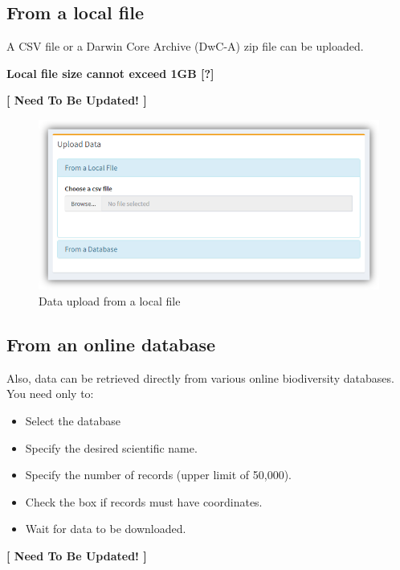 \documentclass[]{book}
\providecommand{\tightlist}{%
  \setlength{\itemsep}{0pt}\setlength{\parskip}{0pt}}
\theoremstyle{definition}
\theoremstyle{definition}
\theoremstyle{definition}
\theoremstyle{remark}
\begin{document}
\subsection{From a local file}\label{from-a-local-file}

A CSV file or a Darwin Core Archive (DwC-A) zip file can be uploaded.

\textbf{Local file size cannot exceed {1GB {[}?{]}}}

\textbf{{{[} Need To Be Updated! {]}}}

\begin{figure}
\centering
\includegraphics{img/bdDwC_Up-local_file.png}
\caption{Data upload from a local file}
\end{figure}

\subsection{From an online database}\label{from-an-online-database}

Also, data can be retrieved directly from various online biodiversity
databases. You need only to:

\begin{itemize}
\tightlist
\item
  Select the database
\item
  Specify the desired scientific name.
\item
  Specify the number of records (upper limit of 50,000).
\item
  Check the box if records must have coordinates.
\item
  Wait for data to be downloaded.
\end{itemize}

\textbf{{{[} Need To Be Updated! {]}}}
\end{document}
